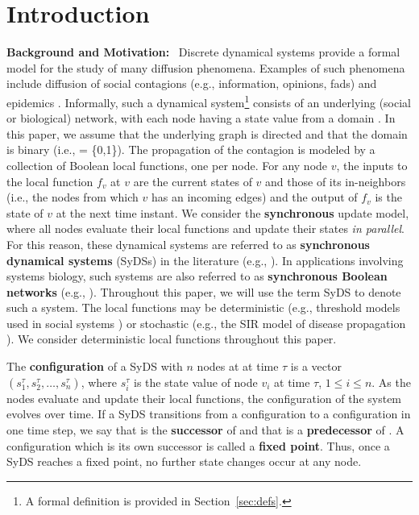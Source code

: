 \section{Introduction}
\label{sec:intro}



\smallskip

\textbf{Background and Motivation:}~
Discrete dynamical systems provide a formal model
for the study of many diffusion phenomena.
Examples of such phenomena include diffusion of social contagions
(e.g., information, opinions, fads) and epidemics
\cite{Adiga-etal-2019,Chistikov-etal-2020,OU-2020,MR-2007}.
Informally, such a dynamical system\footnote{A formal definition
is provided in Section~\ref{sec:defs}.}
consists of an underlying (social or biological) network, with each node having a
state value from a domain \bbb.
In this paper, we assume that the underlying
graph is directed and that the domain is binary (i.e., \bbb{} = \{0,1\}).
The propagation of the contagion is modeled by a collection
of Boolean local functions, one per node.
For any node $v$, the inputs to the local function $f_v$ at $v$
are the current states of $v$ and those of its in-neighbors (i.e., the nodes
from which $v$ has an incoming edges) and the output of $f_v$
is the state of $v$ at the next time instant.
We consider the \textbf{synchronous} update model, where all
nodes evaluate their local functions and update their states
\emph{in parallel}.
For this reason, these dynamical systems are referred to
as \textbf{synchronous dynamical systems} (SyDSs) in
the literature (e.g., \cite{Adiga-etal-2019,Rosenkrantz-etal-2018}).
In applications involving systems biology, such systems are also
referred to as \textbf{synchronous Boolean networks}
(e.g., \cite{Kauffman-etal-2003,OU-2020,Akutsu-etal-2007}).
Throughout this paper, we will use the term SyDS to denote such a system.
The local functions may be deterministic (e.g., threshold models
used in social systems \cite{granovetter-1978}) or stochastic
(e.g., the SIR model of disease propagation \cite{Easley-Kleinberg-2010}).
We consider deterministic local functions throughout this paper.

The \textbf{configuration} of a SyDS with $n$ nodes at at time $\tau$ is a
vector $(s_1^{\tau}, s_2^{\tau}, \ldots, s_n^{\tau})$, where $s_i^{\tau}$
is the state value of node $v_i$ at time $\tau$, $1 \leq i \leq n$.
As the nodes evaluate and update their local functions, the configuration
of the system evolves over time.
If a SyDS transitions from a configuration \calc{} to a configuration \calcp{}
in one time step, we say that \calcp{} is the \textbf{successor} of \calc{} and that
\calc{} is a \textbf{predecessor} of \calcp.
A configuration \calc{} which is its own successor is called a
\textbf{fixed point}.
Thus, once a SyDS reaches a fixed point, no further state changes
occur at any node.

